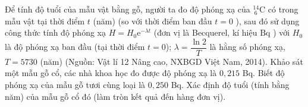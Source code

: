 \begin{ex}%
	Để tính độ tuổi của mẫu vật bằng gỗ, người ta đo độ phóng xạ của $_{~6}^{14}\mathrm{C}$  có trong mẫu vật tại thời điểm $t$ (năm) (so với thời điểm ban đầu $t=0$ ), sau đó sử dụng công thức tính độ phóng xạ $H=H_0 \mathrm{e}^{-\lambda t}$ (đơn vị là Becquerel, kí hiệu $\mathrm{Bq}$ ) với $H_0$ là độ phóng xạ ban đầu (tại thời điểm $t=0$); $\lambda=\dfrac{\ln 2}{T}$ là hằng số phóng xạ, $T=5730$ (năm) (Nguồn: Vật lí 12 Nâng cao, NXBGD Việt Nam, 2014). Khảo sát một mẫu gỗ cổ, các nhà khoa học đo được độ phóng xạ là $0{,}215$ Bq. Biết độ phóng xạ của mẫu gỗ tươi cùng loại là $0{,}250$ Bq. Xác định độ tuổi (tính bằng năm) của mẫu gỗ cổ đó (làm tròn kết quả đến hàng đơn vị).\\
\end{ex}


